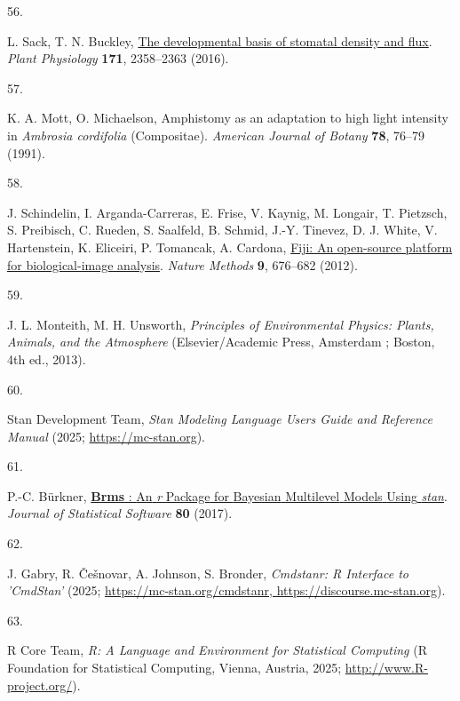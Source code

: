 \documentclass[
  letterpaper,
  DIV=11,
  numbers=noendperiod]{scrartcl}
\newlength{\cslhangindent}
\newlength{\csllabelwidth}
\newenvironment{CSLReferences}[2] %
 {\begin{list}{}{%
  \setlength{\itemindent}{0pt}
  \setlength{\leftmargin}{0pt}
  \setlength{\parsep}{0pt}
  \ifodd #1
   \setlength{\leftmargin}{\cslhangindent}
   \setlength{\itemindent}{-1\cslhangindent}
  \fi
  \setlength{\itemsep}{#2\baselineskip}}}
 {\end{list}}
\newcommand{\CSLLeftMargin}[1]{\parbox[t]{\csllabelwidth}{\strut#1\strut}}
\newcommand{\CSLRightInline}[1]{\parbox[t]{\linewidth - \csllabelwidth}{\strut#1\strut}}
\begin{document}
\begin{CSLReferences}{0}{1}
\CSLLeftMargin{56. }%
\CSLRightInline{L. Sack, T. N. Buckley,
\href{https://doi.org/10.1104/pp.16.00476}{The developmental basis of
stomatal density and flux}. \emph{Plant Physiology} \textbf{171},
2358--2363 (2016).}

\CSLLeftMargin{57. }%
\CSLRightInline{K. A. Mott, O. Michaelson, Amphistomy as an adaptation
to high light intensity in \emph{{Ambrosia} cordifolia} ({Compositae}).
\emph{American Journal of Botany} \textbf{78}, 76--79 (1991).}

\CSLLeftMargin{58. }%
\CSLRightInline{J. Schindelin, I. Arganda-Carreras, E. Frise, V. Kaynig,
M. Longair, T. Pietzsch, S. Preibisch, C. Rueden, S. Saalfeld, B.
Schmid, J.-Y. Tinevez, D. J. White, V. Hartenstein, K. Eliceiri, P.
Tomancak, A. Cardona, \href{https://doi.org/10.1038/nmeth.2019}{Fiji: An
open-source platform for biological-image analysis}. \emph{Nature
Methods} \textbf{9}, 676--682 (2012).}

\CSLLeftMargin{59. }%
\CSLRightInline{J. L. Monteith, M. H. Unsworth, \emph{Principles of
Environmental Physics: Plants, Animals, and the Atmosphere}
(Elsevier/Academic Press, Amsterdam ; Boston, 4th ed., 2013).}

\CSLLeftMargin{60. }%
\CSLRightInline{Stan Development Team, \emph{Stan {Modeling} {Language}
{Users} {Guide} and {Reference} {Manual}} (2025;
\url{https://mc-stan.org}).}

\CSLLeftMargin{61. }%
\CSLRightInline{P.-C. Bürkner,
\href{https://doi.org/10.18637/jss.v080.i01}{\textbf{Brms} : {An}
\emph{r} {Package} for {Bayesian} {Multilevel} {Models} {Using}
\emph{stan}}. \emph{Journal of Statistical Software} \textbf{80}
(2017).}

\CSLLeftMargin{62. }%
\CSLRightInline{J. Gabry, R. Češnovar, A. Johnson, S. Bronder,
\emph{Cmdstanr: {R} {Interface} to '{CmdStan}'} (2025;
\href{https://mc-stan.org/cmdstanr,\%20https://discourse.mc-stan.org}{https://mc-stan.org/cmdstanr,
https://discourse.mc-stan.org}).}

\CSLLeftMargin{63. }%
\CSLRightInline{R Core Team, \emph{R: {A} {Language} and {Environment}
for {Statistical} {Computing}} (R Foundation for Statistical Computing,
Vienna, Austria, 2025; \url{http://www.R-project.org/}).}


\end{CSLReferences}
\end{document}
